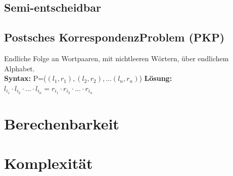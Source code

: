 \documentclass[12pt,a4paper]{article}
\begin{document}
	\subsection{Semi-entscheidbar}

	\subsection{Postsches KorrespondenzProblem (PKP)}
		Endliche Folge an Wortpaaren, mit nichtleeren Wörtern, über endlichem Alphabet.\\
		\textbf{Syntax:} P=($(l_1, r_1), (l_2, r_2), ...(l_n, r_n)$) \hfill \textbf{Lösung:} $l_{i_1} \cdot l_{i_2} \cdot ... \cdot l_{i_n} = r_{i_1} \cdot r_{i_2} \cdot ... \cdot r_{i_n}$

\section{Berechenbarkeit}

\section{Komplexität}
\end{document}
